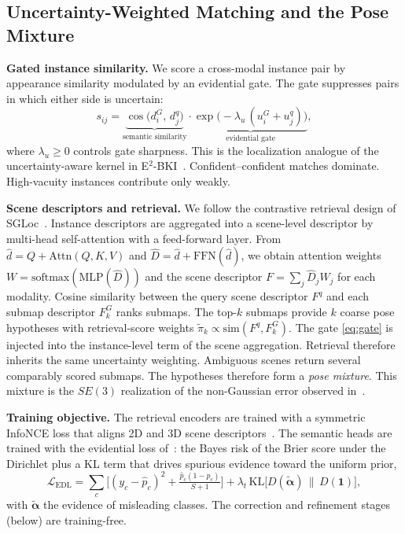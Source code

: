 \documentclass[journal]{IEEEtran}
\begin{document}
\subsection{Uncertainty-Weighted Matching and the Pose Mixture}
\textbf{Gated instance similarity.} We score a cross-modal instance pair by appearance similarity modulated by an evidential gate. The gate suppresses pairs in which either side is uncertain:
\begin{equation}
s_{ij}=\underbrace{\cos\!\big(d_i^G,\,d_j^q\big)}_{\text{semantic similarity}}\cdot
\underbrace{\exp\!\big(-\lambda_u\,(u_i^G+u_j^q)\big)}_{\text{evidential gate}},
\label{eq:gate}
\end{equation}
where $\lambda_u\!\ge\!0$ controls gate sharpness. This is the localization analogue of the uncertainty-aware kernel in E$^2$-BKI~\cite{e2bki}. Confident--confident matches dominate. High-vacuity instances contribute only weakly.

\textbf{Scene descriptors and retrieval.} We follow the contrastive retrieval design of SGLoc~\cite{sgloc}. Instance descriptors are aggregated into a scene-level descriptor by multi-head self-attention with a feed-forward layer. From $\hat{d}=Q+\mathrm{Attn}(Q,K,V)$ and $\hat{D}=\hat{d}+\mathrm{FFN}(\hat{d})$, we obtain attention weights $W=\mathrm{softmax}(\mathrm{MLP}(\hat{D}))$ and the scene descriptor $F=\sum_j \hat{D}_j W_j$ for each modality. Cosine similarity between the query scene descriptor $F^{q}$ and each submap descriptor $F^{G}_k$ ranks submaps. The top-$k$ submaps provide $k$ coarse pose hypotheses with retrieval-score weights $\tilde{\pi}_k\propto \mathrm{sim}(F^q,F^G_k)$. The gate \eqref{eq:gate} is injected into the instance-level term of the scene aggregation. Retrieval therefore inherits the same uncertainty weighting. Ambiguous scenes return several comparably scored submaps. The hypotheses therefore form a \emph{pose mixture}. This mixture is the $SE(3)$ realization of the non-Gaussian error observed in~\cite{ksenet}.

\textbf{Training objective.} The retrieval encoders are trained with a symmetric InfoNCE loss that aligns 2D and 3D scene descriptors~\cite{sgloc}. The semantic heads are trained with the evidential loss of~\cite{edl}: the Bayes risk of the Brier score under the Dirichlet plus a KL term that drives spurious evidence toward the uniform prior,
\begin{equation}
\mathcal{L}_{\mathrm{EDL}}=\sum_{c}\Big[(y_c-\hat{p}_c)^2+\tfrac{\hat{p}_c(1-\hat{p}_c)}{S+1}\Big]
+\lambda_t\,\mathrm{KL}\!\big[D(\tilde{\bm{\alpha}})\,\|\,D(\mathbf{1})\big],
\label{eq:edlloss}
\end{equation}
with $\tilde{\bm\alpha}$ the evidence of misleading classes. The correction and refinement stages (below) are training-free.
\end{document}
